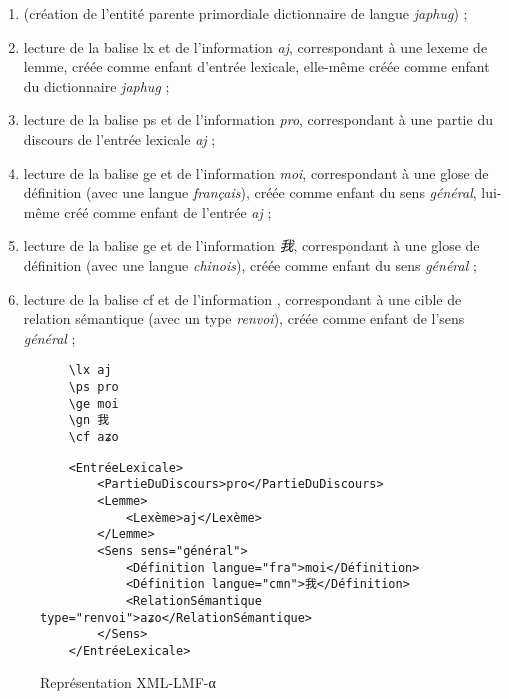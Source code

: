 \documentclass[10pt]{report}
\newcommand{\balise}[1]{\textcolor{red!80}{#1}}
\newcommand{\entité}[1]{\textcolor{blue!60!black}{#1}}
\newcommand{\caractéristique}[1]{\textcolor{green!60!black}{#1}}
\newcommand{\entitétechnique}[1]{\textcolor{blue!50!red}{#1}}
\begin{document}
\begin{enumerate}
	\item (création de l’entité parente primordiale \entité{dictionnaire} de \caractéristique{langue} \textit{japhug}) ;
	\item lecture de la balise \balise{lx} et de l’information \textit{aj}, correspondant à une \caractéristique{lexeme} de \entité{lemme}, créée comme enfant d’\entité{entrée lexicale}, elle-même créée comme enfant du \entité{dictionnaire} \textit{japhug} ;
	\item lecture de la balise \balise{ps} et de l’information \textit{pro}, correspondant à une \caractéristique{partie du discours} de l’\entité{entrée lexicale} \textit{aj} ;
	\item lecture de la balise \balise{ge} et de l’information \textit{moi}, correspondant à une \caractéristique{glose} de \entité{définition} (avec une \caractéristique{langue} \textit{français}), créée comme enfant du \entité{sens} \textit{général}, lui-même créé comme enfant de l’\entité{entrée} \textit{aj} ;
	\item lecture de la balise \balise{ge} et de l’information \textit{我}, correspondant à une \caractéristique{glose} de \entité{définition} (avec une \caractéristique{langue} \textit{chinois}), créée comme enfant du \entité{sens} \textit{général} ;
	\item lecture de la balise \balise{cf} et de l’information \textit{}, correspondant à une \caractéristique{cible} de \entité{relation sémantique} (avec un \caractéristique{type} \textit{renvoi}), créée comme enfant de l’\entité{sens} \textit{général} ;
\end{enumerate}

\begin{figure}[H]
	\centering
	\begin{minipage}{0.2\linewidth}
    \begin{verbatim}
    \lx aj
    \ps pro
    \ge moi
    \gn 我
    \cf aʑo
    \end{verbatim}
	\end{minipage}%
	\begin{minipage}{0.8\linewidth}
    \begin{verbatim}
    <EntréeLexicale>
        <PartieDuDiscours>pro</PartieDuDiscours>
        <Lemme>
            <Lexème>aj</Lexème>
        </Lemme>
        <Sens sens="général">
            <Définition langue="fra">moi</Définition>
            <Définition langue="cmn">我</Définition>
            <RelationSémantique type="renvoi">aʑo</RelationSémantique>
        </Sens>	
    </EntréeLexicale>
    \end{verbatim}	
	\end{minipage} 
	\caption{Représentation XML-LMF-α}
	\label{rep-xml-lmf-α}
\end{figure}
\end{document}
